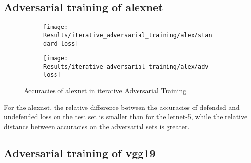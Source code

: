 \documentclass[draft,final]{vutinfth} %
\begin{document}
\FloatBarrier

\subsection{Adversarial training of alexnet}

\begin{figure}[h]
  \begin{subfigure}[b]{0.5\columnwidth}
		\centering
    \texttt{[image: Results/iterative\_adversarial\_training/alex/standard\_loss]}
    \label{fig:exp:iat:alex:data}
  \end{subfigure}
  \begin{subfigure}[b]{0.5\columnwidth}
		\centering
    \texttt{[image: Results/iterative\_adversarial\_training/alex/adv\_loss]}
    \label{fig:exp:iat:alex:loss}
  \end{subfigure}
  \caption{Accuracies of alexnet in iterative Adversarial Training}
\end{figure}

\begin{table}[h]
	\noindent{}
		\caption{Accuracies during training with adversarial loss}
\end{table}

For the alexnet, the relative difference between the accuracies of defended and undefended loss on the test set is smaller than for the letnet-5, while the relative distance between accuracies on the adversarial sets is greater.

\FloatBarrier
\clearpage

\subsection{Adversarial training of vgg19}
\end{document}
